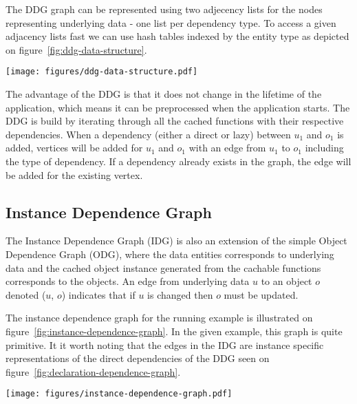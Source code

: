 The DDG graph can be represented using two adjecency lists for the nodes representing underlying data - one list per dependency type. To access a given adjacency lists fast we can use hash tables indexed by the entity type as depicted on figure~\ref{fig:ddg-data-structure}.

\begin{figure*}[ht!]
  \centering
  \texttt{[image: figures/ddg-data-structure.pdf]}
  \caption{An illustration of the data structure representing the DDG on figure~\ref{fig:declaration-dependence-graph}}
  \label{fig:ddg-data-structure}
\end{figure*}

The advantage of the DDG is that it does not change in the lifetime of the application, which means it can be preprocessed when the application starts. The DDG is build by iterating through all the cached functions with their respective dependencies. When a dependency (either a direct or lazy) between $u_1$ and $o_1$ is added, vertices will be added for $u_1$ and $o_1$ with an edge from $u_1$ to $o_1$ including the type of dependency. If a dependency already exists in the graph, the edge will be added for the existing vertex.




\subsection{Instance Dependence Graph}
\label{subsec:instance-dependence-graph}

The Instance Dependence Graph (IDG) is also an extension of the simple Object Dependence Graph (ODG), where the data entities corresponds to underlying data and the cached object instance generated from the cachable functions corresponds to the objects. An edge from underlying data $u$ to an object $o$ denoted ($u$, $o$) indicates that if $u$ is changed then $o$ must be updated.

The instance dependence graph for the running example is illustrated on figure~\ref{fig:instance-dependence-graph}. In the given example, this graph is quite primitive. It it worth noting that the edges in the IDG are instance specific representations of the direct dependencies of the DDG seen on figure~\ref{fig:declaration-dependence-graph}.

\begin{figure*}[ht!]
  \centering
  \texttt{[image: figures/instance-dependence-graph.pdf]}
  \caption{An example of an Instance Dependence Graph based on the running example}
  \label{fig:instance-dependence-graph}
\end{figure*}


